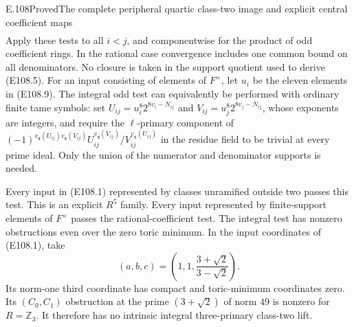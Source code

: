 \begin{statement}{E.108}{Proved}{The complete peripheral quartic class-two image and explicit central coefficient maps}
\[\begin{array}{ll}
 \end{array}
 \tag{E108.5}
\]
Apply these tests to all $i<j$, and componentwise for the product
of odd coefficient rings.  In the rational case convergence
includes one common bound on all denominators.  No closure is
taken in the support quotient used to derive (E108.5).
For an input consisting of elements of $F^\times$, let $u_i$
be the eleven elements in (E108.9).  The integral odd test
can equivalently be performed with ordinary finite tame symbols:
set $U_{ij}=u_i^8 2^{8v_i-N_{ij}}$ and
$V_{ij}=u_j^8 2^{8v_j-N_{ij}}$, whose exponents are integers,
and require the $\ell$-primary component of
$(-1)^{v_{\mathfrak q}(U_{ij})v_{\mathfrak q}(V_{ij})}
 U_{ij}^{v_{\mathfrak q}(V_{ij})}/
 V_{ij}^{v_{\mathfrak q}(U_{ij})}$ in the residue field to
be trivial at every prime ideal.  Only the union of the
numerator and denominator supports is needed.

Every input in (E108.1) represented by classes unramified outside
two passes this test.  This is an explicit $R^5$ family.  Every
input represented by finite-support elements of $F^\times$ passes
the rational-coefficient test.  The integral test has nonzero
obstructions even over the zero toric minimum.  In the input
coordinates of (E108.1), take
\[
       (a,b,c)=\left(1,1,\frac{3+\sqrt2}{3-\sqrt2}\right).
 \tag{E108.6}
\]
Its norm-one third coordinate has compact and toric-minimum
coordinates zero.  Its $(C_0,C_1)$ obstruction at the prime
$(3+\sqrt2)$ of norm $49$ is nonzero for $R=\mathbb Z_3$.
It therefore has no intrinsic integral three-primary
class-two lift.


\end{statement}
